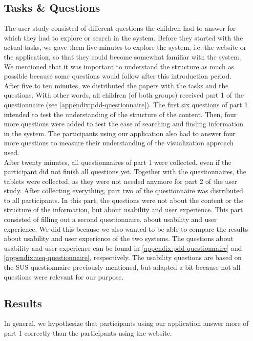 \subsection{Tasks \& Questions}
The user study consisted of different questions the children had to answer for which they had to explore or search in the system. Before they started with the actual tasks, we gave them five minutes to explore the system, i.e. the website or the application, so that they could become somewhat familiar with the system. We mentioned that it was important to understand the structure as much as possible because some questions would follow after this introduction period.\\

After five to ten minutes, we distributed the papers with the tasks and the questions. With other words, all children (of both groups) received part 1 of the questionnaire (see \autoref{appendix:pdd-questionnaire}). The first six questions of part 1 intended to test the understanding of the structure of the content. Then, four more questions were added to test the ease of searching and finding information in the system. The participants using our application also had to answer four more questions to measure their understanding of the visualization approach used.\\

After twenty minutes, all questionnaires of part 1 were collected, even if the participant did not finish all questions yet. Together with the questionnaires, the tablets were collected, as they were not needed anymore for part 2 of the user study. After collecting everything, part two of the questionnaire was distributed to all participants. In this part, the questions were not about the content or the structure of the information, but about usability and user experience. This part consisted of filling out a second questionnaire, about usability and user experience. We did this because we also wanted to be able to compare the results about usability and user experience of the two systems. The questions about usability and user experience can be found in \autoref{appendix:pdd-questionnaire} and \autoref{appendix:ueq-questionnaire}, respectively. The usability questions are based on the SUS questionnaire previously mentioned, but adapted a bit because not all questions were relevant for our purpose.



\subsection{Results}
In general, we hypothesize that participants using our application answer more of part 1 correctly than the participants using the website.\\

